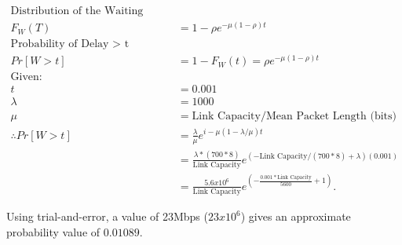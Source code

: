 \begin{align*}
	\text{Distribution of the Waiting Time:} \\
	F_{W}(T) &= 1 - \rho e^{-\mu(1-\rho)t} \\
	\text{Probability of Delay > t} \\
	Pr[W > t] &= 1 - F_{W}(t) = \rho e^{-\mu(1-\rho)t} \\
	\text{Given:} \\
	t &= 0.001 \\
	\lambda &= 1000 \\
	\mu &= \text{Link Capacity} / \text{Mean Packet Length (bits)} \\
	\therefore Pr[W>t] &= \frac{\lambda}{\mu} e^{i-\mu(1-\lambda/\mu)t} \\
			   &= \frac{\lambda*(700*8)}{\text{Link
				   Capacity}} e^{(-\text{Link Capacity}/(700*8) +
			   \lambda)(0.001)} \\
			   &= \frac{5.6x10^{6}}{\text{Link Capacity}}
			   e^{(-\frac{0.001*\text{Link Capacity}}{5600} +
			   1)}
.\end{align*}

Using trial-and-error, a value of 23Mbps ($23x10^{6}$) gives an approximate
probability value of $0.01089$.
